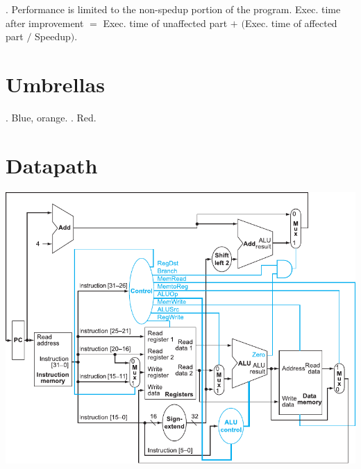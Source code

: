 \documentclass{slnotes}
\begin{document}
. Performance is limited to the non-spedup portion of the program. Exec. time after improvement \(=\) Exec. time of unaffected part \(+\) \((\)Exec. time of affected part \(/\) Speedup\()\).

\chapter{Umbrellas}
. Blue, orange. . Red.

\chapter{Datapath}
\includegraphics[width=\columnwidth]{simple-mips-datapath.pdf}
\end{document}
